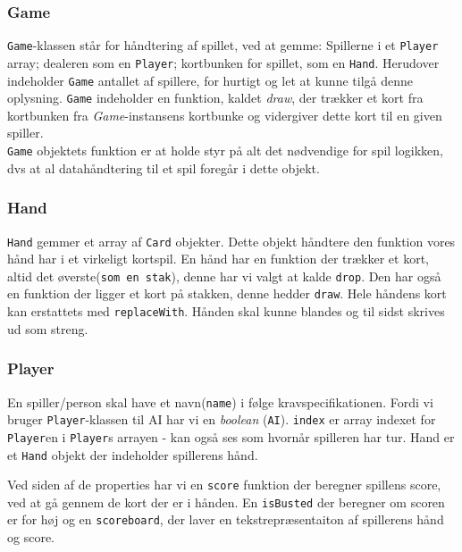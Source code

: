 \documentclass[a4paper]{article}
\begin{document}
      \subsubsection*{Game}
      \texttt{Game}-klassen står for håndtering af spillet, ved at gemme: Spillerne i et \texttt{Player} array; dealeren som en \texttt{Player}; kortbunken for spillet, som en \texttt{Hand}.
      Herudover indeholder \texttt{Game} antallet af spillere, for hurtigt og let at kunne tilgå denne oplysning.
      \texttt{Game} indeholder en funktion, kaldet \textit{draw}, der trækker et kort fra kortbunken fra \textit{Game}-instansens kortbunke og vidergiver dette kort til en given spiller. \\

      \texttt{Game} objektets funktion er at holde styr på alt det nødvendige for spil logikken,
      dvs at al datahåndtering til et spil foregår i dette objekt.

      \subsubsection*{Hand}
      \texttt{Hand} gemmer et array af \texttt{Card} objekter. Dette objekt håndtere den funktion vores hånd har i et virkeligt kortspil.
      En hånd har en funktion der trækker et kort, altid det øverste(\texttt{som en stak}), denne har vi valgt at kalde \lstinline$drop$.
      Den har også en funktion der ligger et kort på stakken, denne hedder \lstinline$draw$.
      Hele håndens kort kan erstattets med \lstinline$replaceWith$. Hånden skal kunne blandes og til sidst skrives ud som streng.

      \subsubsection*{Player}
      En spiller/person skal have et navn(\lstinline$name$) i følge kravspecifikationen.
      Fordi vi bruger \texttt{Player}-klassen til AI har vi en \textit{boolean} (\lstinline$AI$).
      \lstinline$index$ er array indexet for \texttt{Player}en i \texttt{Player}s arrayen - kan også ses som hvornår spilleren har tur.
      Hand er et \texttt{Hand} objekt der indeholder spillerens hånd.


      Ved siden af de properties har vi en \lstinline$score$ funktion der beregner spillens score,
      ved at gå gennem de kort der er i hånden.
      En \lstinline$isBusted$ der beregner om scoren er for høj og en \lstinline$scoreboard$,
      der laver en tekstrepræsentaiton af spillerens hånd og score.
\end{document}
